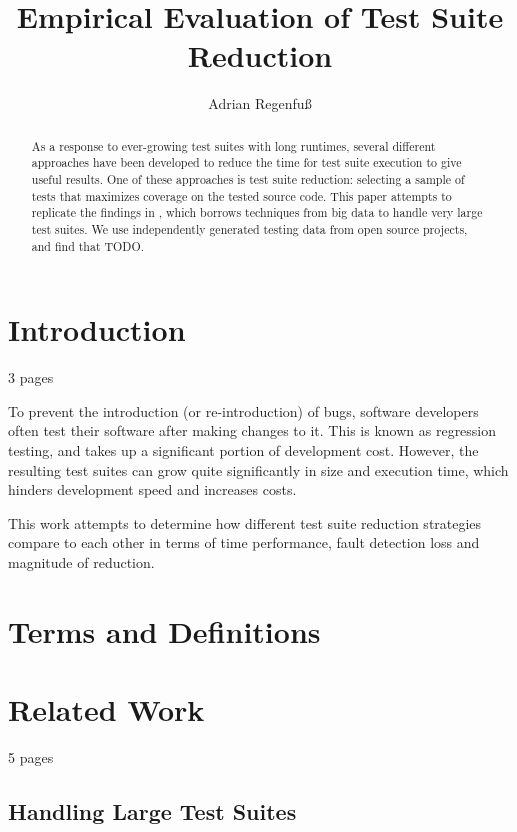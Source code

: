 \documentclass[a4paper,10pt]{article}
\title{Empirical Evaluation of Test Suite Reduction}
\author{Adrian Regenfuß}
\begin{document}
\maketitle

\tableofcontents
\newpage

\begin{abstract}
As a response to ever-growing test suites with long runtimes, several
different approaches have been developed to reduce the time for test
suite execution to give useful results. One of these approaches is test
suite reduction: selecting a sample of tests that maximizes coverage on
the tested source code. This paper attempts to replicate the findings
in \citealt{cruciani2019scalable}, which borrows techniques from big
data to handle very large test suites. We use independently generated
testing data from open source projects, and find that TODO.
\end{abstract}

\section{Introduction}

3 pages

To prevent the introduction (or re-introduction) of bugs, software
developers often test their software after making changes to it.
This is known as regression testing, and takes up a significant portion
of development cost. However, the resulting test suites can grow quite
significantly in size and execution time, which hinders development
speed and increases costs.

This work attempts to determine how different test suite reduction
strategies compare to each other in terms of time performance, fault
detection loss and magnitude of reduction.

\section{Terms and Definitions}

\section{Related Work}

5 pages

\subsection{Handling Large Test Suites}
\end{document}
